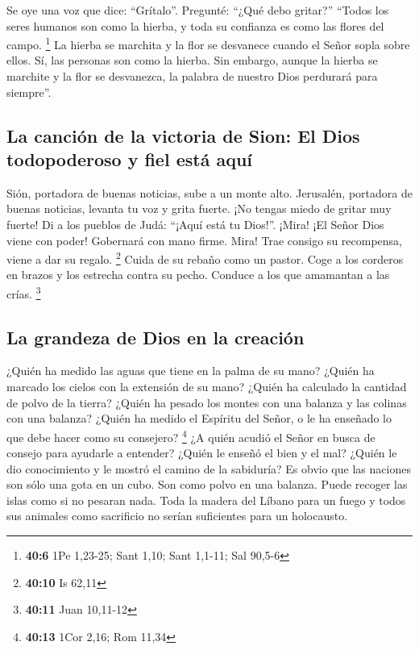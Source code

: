  Se oye una voz que dice: ``Grítalo''. Pregunté: ``¿Qué
debo gritar?'' ``Todos los seres humanos son como la hierba, y toda su
confianza es como las flores del campo. \footnote{\textbf{40:6} 1Pe
  1,23-25; Sant 1,10; Sant 1,1-11; Sal 90,5-6}  La hierba
se marchita y la flor se desvanece cuando el Señor sopla sobre ellos.
Sí, las personas son como la hierba.  Sin embargo, aunque
la hierba se marchite y la flor se desvanezca, la palabra de nuestro
Dios perdurará para siempre''.

\hypertarget{la-canciuxf3n-de-la-victoria-de-sion-el-dios-todopoderoso-y-fiel-estuxe1-aquuxed}{%
\subsection{La canción de la victoria de Sion: El Dios todopoderoso y
fiel está
aquí}\label{la-canciuxf3n-de-la-victoria-de-sion-el-dios-todopoderoso-y-fiel-estuxe1-aquuxed}}

 Sión, portadora de buenas noticias, sube a un monte alto.
Jerusalén, portadora de buenas noticias, levanta tu voz y grita fuerte.
¡No tengas miedo de gritar muy fuerte! Di a los pueblos de Judá: ``¡Aquí
está tu Dios!''.  ¡Mira! ¡El Señor Dios viene con poder!
Gobernará con mano firme. Mira! Trae consigo su recompensa, viene a dar
su regalo. \footnote{\textbf{40:10} Is 62,11}  Cuida de
su rebaño como un pastor. Coge a los corderos en brazos y los estrecha
contra su pecho. Conduce a los que amamantan a las crías. \footnote{\textbf{40:11}
  Juan 10,11-12}

\hypertarget{la-grandeza-de-dios-en-la-creaciuxf3n}{%
\subsection{La grandeza de Dios en la
creación}\label{la-grandeza-de-dios-en-la-creaciuxf3n}}

 ¿Quién ha medido las aguas que tiene en la palma de su
mano? ¿Quién ha marcado los cielos con la extensión de su mano? ¿Quién
ha calculado la cantidad de polvo de la tierra? ¿Quién ha pesado los
montes con una balanza y las colinas con una balanza? 
¿Quién ha medido el Espíritu del Señor, o le ha enseñado lo que debe
hacer como su consejero? \footnote{\textbf{40:13} 1Cor 2,16; Rom 11,34}
 ¿A quién acudió el Señor en busca de consejo para
ayudarle a entender? ¿Quién le enseñó el bien y el mal? ¿Quién le dio
conocimiento y le mostró el camino de la sabiduría?  Es
obvio que las naciones son sólo una gota en un cubo. Son como polvo en
una balanza. Puede recoger las islas como si no pesaran nada.
 Toda la madera del Líbano para un fuego y todos sus
animales como sacrificio no serían suficientes para un holocausto.

